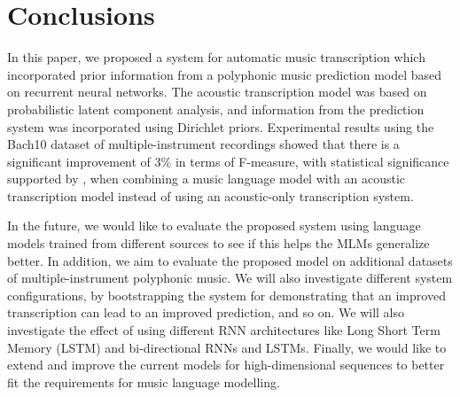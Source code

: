 \section{Conclusions} \label{sec:conclusions}

In this paper, we proposed a system for automatic music transcription which incorporated prior information from a polyphonic music prediction model based on recurrent neural networks. The acoustic transcription model was based on probabilistic latent component analysis, and information from the prediction system was incorporated using Dirichlet priors. Experimental results using the Bach10 dataset of multiple-instrument recordings showed that there is a significant improvement of 3\% in terms of F-measure, with statistical significance supported by \cite{BenetosThesis}, when combining a music language model with an acoustic transcription model instead of using an acoustic-only transcription system.

In the future, we would like to evaluate the proposed system using language models trained from different sources to see if this helps the MLMs generalize better. In addition, we aim to evaluate the proposed model on additional datasets of multiple-instrument polyphonic music. We will also investigate different system configurations, by bootstrapping the system for demonstrating that an improved transcription can lead to an improved prediction, and so on. We will also investigate the effect of using different RNN architectures like Long Short Term Memory (LSTM) and bi-directional RNNs and LSTMs. Finally, we would like to extend and improve the current models for high-dimensional sequences to better fit the requirements for music language modelling. 